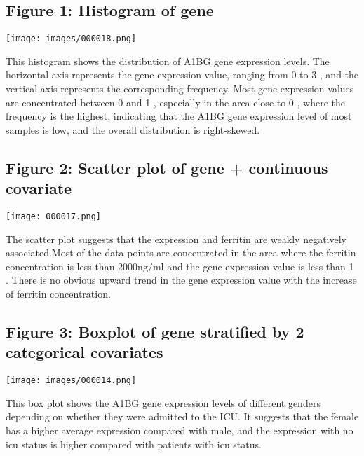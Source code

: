 \documentclass[10pt]{article}
\begin{document}
\subsection*{Figure 1: Histogram of gene}


\begin{center}
\texttt{[image: images/000018.png]}

\end{center}

\noindent This histogram shows the distribution of A1BG gene expression levels. The horizontal axis represents the gene expression value, ranging from 0 to 3 , and the vertical axis represents the corresponding frequency. Most gene expression values are concentrated between 0 and 1 , especially in the area close to 0 , where the frequency is the highest, indicating that the A1BG gene expression level of most samples is low, and the overall distribution is right-skewed.
\subsection*{Figure 2: Scatter plot of gene + continuous covariate}

\begin{center}
\texttt{[image: 000017.png]}

\end{center}

 \noindent The scatter plot suggests that the expression and ferritin are weakly negatively associated.Most of the data points are concentrated in the area where the ferritin concentration is less than $2000 \mathrm{ng} / \mathrm{ml}$ and the gene expression value is less than 1 . There is no obvious upward trend in the gene expression value with the increase of ferritin concentration.

\subsection*{Figure 3: Boxplot of gene stratified by 2 categorical covariates}

\begin{center}
\texttt{[image: images/000014.png]}
\end{center}


\noindent This box plot shows the A1BG gene expression levels of different genders depending on whether they were admitted to the ICU. It suggests that the female has a higher average expression compared with male, and the expression with no icu status is higher compared with patients with icu status.
\end{document}

